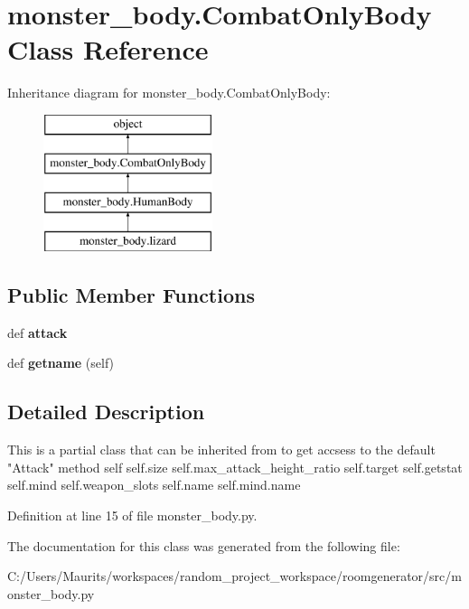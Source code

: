\hypertarget{classmonster__body_1_1_combat_only_body}{}\section{monster\+\_\+body.\+Combat\+Only\+Body Class Reference}
\label{classmonster__body_1_1_combat_only_body}
Inheritance diagram for monster\+\_\+body.\+Combat\+Only\+Body\+:\begin{figure}[H]
\begin{center}
\leavevmode
\includegraphics[height=4.000000cm]{classmonster__body_1_1_combat_only_body}
\end{center}
\end{figure}
\subsection*{Public Member Functions}
\begin{DoxyCompactItemize}
\item 
\hypertarget{classmonster__body_1_1_combat_only_body_aafc483ca66f63716f29238d171b38be4}{}def {\bfseries attack}\label{classmonster__body_1_1_combat_only_body_aafc483ca66f63716f29238d171b38be4}

\item 
\hypertarget{classmonster__body_1_1_combat_only_body_a98971107f4f62db7b2e5393821733872}{}def {\bfseries getname} (self)\label{classmonster__body_1_1_combat_only_body_a98971107f4f62db7b2e5393821733872}

\end{DoxyCompactItemize}


\subsection{Detailed Description}
\begin{DoxyVerb}This is a partial class that can be inherited from to get accsess to the default "Attack" method
self
self.size
self.max_attack_height_ratio
self.target
self.getstat
self.mind
self.weapon_slots
self.name
self.mind.name
\end{DoxyVerb}
 

Definition at line 15 of file monster\+\_\+body.\+py.



The documentation for this class was generated from the following file\+:\begin{DoxyCompactItemize}
\item 
C\+:/\+Users/\+Maurits/workspaces/random\+\_\+project\+\_\+workspace/roomgenerator/src/monster\+\_\+body.\+py\end{DoxyCompactItemize}
